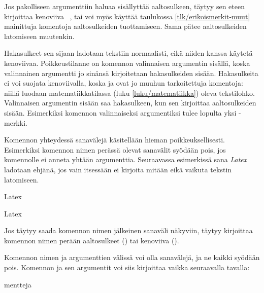 \begin{koodilohkosis}
\komento
{}
\end{koodilohkosis}

\noindent
Jos pakolliseen argumenttiin haluaa sisällyttää aaltosulkeen, täytyy sen
eteen kirjoittaa kenoviiva \komento{\{}~\komento{\}}, tai voi myös
käyttää taulukossa \ref{tlk/erikoismerkit-muut} mainittuja komentoja
aaltosulkeiden tuottamiseen. Sama pätee aaltosulkeiden latomiseen
muutenkin.

Hakasulkeet sen sijaan ladotaan tekstiin normaalisti, eikä niiden kanssa
käytetä kenoviivaa. Poikkeustilanne on komennon valinnaisen argumentin
sisällä, koska valinnainen argumentti jo sinänsä kirjoitetaan
hakasulkeiden sisään. Hakasulkeita ei voi suojata kenoviivalla, koska
\komento{[} ja \komento{]} ovat jo muuhun tarkoitettuja komentoja:
niillä luodaan matematiikkatilassa (luku \ref{luku/matematiikka}) oleva
tekstilohko. Valinnaisen argumentin sisään saa hakasulkeen, kun sen
kirjoittaa aaltosulkeiden sisään. Esimerkiksi komennon
\komentoargv{\{]\}} valinnaiseksi argumentiksi tulee
lopulta yksi \koodi{]}-merkki.

Komennon yhteydessä sanavälejä käsitellään hieman poikkeuksellisesti.
Esimerkiksi komennon nimen perässä olevat sanavälit syödään pois, jos
komennolle ei anneta yhtään argumenttia. Seuraavassa esimerkissä sana
\emph{Latex} ladotaan ehjänä, jos vain  itsessään ei
kirjoita mitään eikä vaikuta tekstin latomiseen.

\begin{koodilohkosis}
La\komento   tex
\end{koodilohkosis}

\begin{tulossis}
  Latex
\end{tulossis}

\noindent
Jos täytyy saada komennon nimen jälkeinen sanaväli näkyviin, täytyy
kirjoittaa komennon nimen perään aaltosulkeet
(\komentoarg{}) tai kenoviiva
(\komentojatko{\keno}).

Komennon nimen ja argumenttien välissä voi olla sanavälejä, ja ne kaikki
syödään pois. Komennon ja sen argumentit voi siis kirjoittaa vaikka
seuraavalla tavalla:

\begin{koodilohkosis}
   {mentteja}
\end{koodilohkosis}

